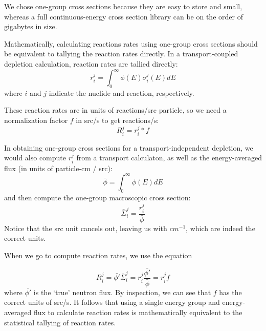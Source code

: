 \documentclass[a4paper,fleqn]{cas-dc}
\begin{document}
        We chose one-group cross sections because they are easy to store and
        small, whereas a full continuous-energy cross section library can be on
        the order of gigabytes in size.
        
        Mathematically, calculating reactions rates using one-group cross
        sections should be equivalent to tallying the reaction rates directly.
        In a transport-coupled depletion calculation, reaction rates are tallied
        directly:
        \begin{equation}
            r^j_i = \int_0^\infty \phi(E) \sigma^j_i(E) dE
        \end{equation}
        where $i$ and $j$ indicate the nuclide and reaction, respectively.

        These reaction rates are in units of reactions/src particle, so we need
        a normalization factor $f$ in src/s to get reactions/s:
        \begin{equation}
            R^j_i = r^j_i * f
        \end{equation}

        In obtaining one-group cross sections for a transport-independent
        depletion, we would also compute $r^j_i$ from a transport calculaton, as
        well as the energy-averaged flux (in units of particle-cm / src):
        \begin{equation}
            \bar{\phi} = \int_0^\infty \phi(E) dE
        \end{equation}
        and then compute the one-group macroscopic cross section:
        \begin{equation}
            \bar{\Sigma}^j_i = \frac{r^j_i}{\bar{\phi}}
        \end{equation}
        Notice that the src unit cancels out, leaving us with $cm^{-1}$, which
        are indeed the correct units.

        When we go to compute reaction rates, we use the equation 

        \begin{equation}
            R^j_i = \bar{\phi'} \bar\Sigma^j_i = r^j_i\frac{\bar{\phi'}}{\bar{\phi}} = r^j_i f
        \end{equation}
        where $\bar{\phi'}$ is the `true' neutron flux. By inspection, we can
        see that $f$ has the correct units of src/s. It follows that using a
        single energy group and energy-averaged flux to calculate reaction rates
        is mathematically equivalent to the statistical tallying of reaction
        rates.
\end{document}
